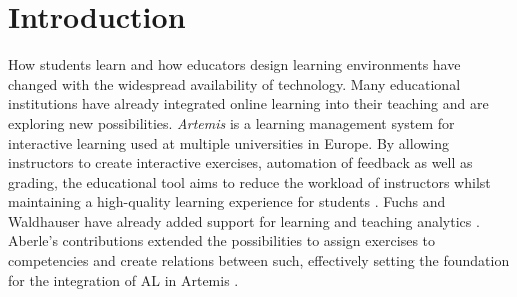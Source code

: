 \documentclass[a4paper,12pt,twoside]{article}
\begin{document}
\setlength{\evensidemargin}{22pt}
\setlength{\oddsidemargin}{22pt}



\lstset{showspaces=false, numbers=left, frame=single, basicstyle=\small}




\fancyhead{}
\pagestyle{fancy}
\fancyhead[LE]{\slshape \leftmark}
\fancyhead[RO]{\slshape \rightmark}
\headheight=15pt

\section{Introduction}

How students learn and how educators design learning environments have changed with the widespread availability of technology. Many educational
institutions have already integrated online learning into their teaching and are exploring new possibilities. \textit{Artemis} is a learning management system for interactive
learning used at multiple universities in Europe.
By allowing instructors to create interactive exercises, automation of feedback as well as grading, the educational tool aims to reduce the
workload of instructors whilst maintaining a high-quality learning experience for students \cite{Krusche_ArTEMiS_An_Automatic_2018}. Fuchs and Waldhauser have already added support
for learning and teaching analytics \cite{fuchs2021,waldhauser2021}. Aberle's contributions extended the possibilities to assign exercises to competencies and create relations
between such, effectively setting the foundation for the integration of \ac{AL} in Artemis \cite{aberle2022}.

\end{document}
